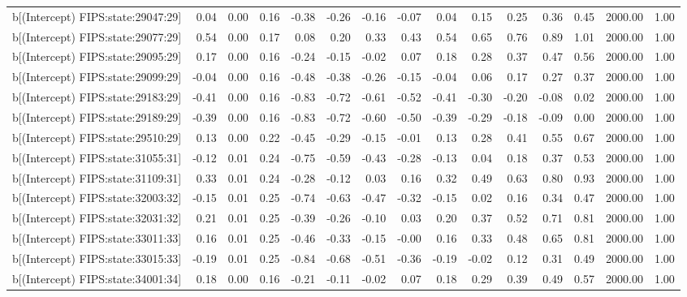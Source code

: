 \begin{table}[ht]
\begin{tabular}{rrrrrrrrrrrrrrr}
  b[(Intercept) FIPS:state:29047:29] & 0.04 & 0.00 & 0.16 & -0.38 & -0.26 & -0.16 & -0.07 & 0.04 & 0.15 & 0.25 & 0.36 & 0.45 & 2000.00 & 1.00 \\ 
  b[(Intercept) FIPS:state:29077:29] & 0.54 & 0.00 & 0.17 & 0.08 & 0.20 & 0.33 & 0.43 & 0.54 & 0.65 & 0.76 & 0.89 & 1.01 & 2000.00 & 1.00 \\ 
  b[(Intercept) FIPS:state:29095:29] & 0.17 & 0.00 & 0.16 & -0.24 & -0.15 & -0.02 & 0.07 & 0.18 & 0.28 & 0.37 & 0.47 & 0.56 & 2000.00 & 1.00 \\ 
  b[(Intercept) FIPS:state:29099:29] & -0.04 & 0.00 & 0.16 & -0.48 & -0.38 & -0.26 & -0.15 & -0.04 & 0.06 & 0.17 & 0.27 & 0.37 & 2000.00 & 1.00 \\ 
  b[(Intercept) FIPS:state:29183:29] & -0.41 & 0.00 & 0.16 & -0.83 & -0.72 & -0.61 & -0.52 & -0.41 & -0.30 & -0.20 & -0.08 & 0.02 & 2000.00 & 1.00 \\ 
  b[(Intercept) FIPS:state:29189:29] & -0.39 & 0.00 & 0.16 & -0.83 & -0.72 & -0.60 & -0.50 & -0.39 & -0.29 & -0.18 & -0.09 & 0.00 & 2000.00 & 1.00 \\ 
  b[(Intercept) FIPS:state:29510:29] & 0.13 & 0.00 & 0.22 & -0.45 & -0.29 & -0.15 & -0.01 & 0.13 & 0.28 & 0.41 & 0.55 & 0.67 & 2000.00 & 1.00 \\ 
  b[(Intercept) FIPS:state:31055:31] & -0.12 & 0.01 & 0.24 & -0.75 & -0.59 & -0.43 & -0.28 & -0.13 & 0.04 & 0.18 & 0.37 & 0.53 & 2000.00 & 1.00 \\ 
  b[(Intercept) FIPS:state:31109:31] & 0.33 & 0.01 & 0.24 & -0.28 & -0.12 & 0.03 & 0.16 & 0.32 & 0.49 & 0.63 & 0.80 & 0.93 & 2000.00 & 1.00 \\ 
  b[(Intercept) FIPS:state:32003:32] & -0.15 & 0.01 & 0.25 & -0.74 & -0.63 & -0.47 & -0.32 & -0.15 & 0.02 & 0.16 & 0.34 & 0.47 & 2000.00 & 1.00 \\ 
  b[(Intercept) FIPS:state:32031:32] & 0.21 & 0.01 & 0.25 & -0.39 & -0.26 & -0.10 & 0.03 & 0.20 & 0.37 & 0.52 & 0.71 & 0.81 & 2000.00 & 1.00 \\ 
  b[(Intercept) FIPS:state:33011:33] & 0.16 & 0.01 & 0.25 & -0.46 & -0.33 & -0.15 & -0.00 & 0.16 & 0.33 & 0.48 & 0.65 & 0.81 & 2000.00 & 1.00 \\ 
  b[(Intercept) FIPS:state:33015:33] & -0.19 & 0.01 & 0.25 & -0.84 & -0.68 & -0.51 & -0.36 & -0.19 & -0.02 & 0.12 & 0.31 & 0.49 & 2000.00 & 1.00 \\ 
  b[(Intercept) FIPS:state:34001:34] & 0.18 & 0.00 & 0.16 & -0.21 & -0.11 & -0.02 & 0.07 & 0.18 & 0.29 & 0.39 & 0.49 & 0.57 & 2000.00 & 1.00 \\ 

\end{tabular}
\end{table}

